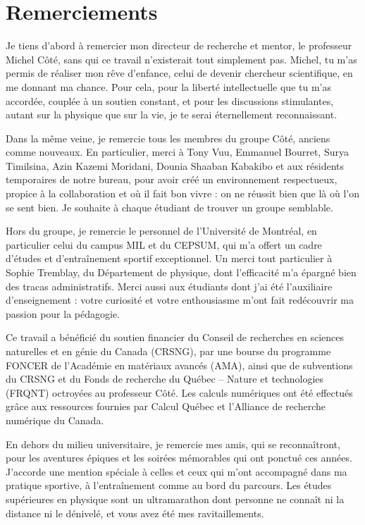 \chapter*{Remerciements}

Je tiens d'abord à remercier mon directeur de recherche et mentor, le professeur Michel Côté, sans qui ce travail n'existerait tout simplement pas. Michel, tu m'as permis de réaliser mon rêve d'enfance, celui de devenir chercheur scientifique, en me donnant ma chance. Pour cela, pour la liberté intellectuelle que tu m'as accordée, couplée à un soutien constant, et pour les discussions stimulantes, autant sur la physique que sur la vie, je te serai éternellement reconnaissant.

Dans la même veine, je remercie tous les membres du groupe Côté, anciens comme nouveaux. En particulier, merci à Tony Vuu, Emmanuel Bourret, Surya Timilsina, Azin Kazemi Moridani, Dounia Shaaban Kabakibo et aux résidents temporaires de notre bureau, pour avoir créé un environnement respectueux, propice à la collaboration et où il fait bon vivre : on ne réussit bien que là où l'on se sent bien. Je souhaite à chaque étudiant de trouver un groupe semblable.

Hors du groupe, je remercie le personnel de l'Université de Montréal, en particulier celui du campus MIL et du CEPSUM, qui m'a offert un cadre d'études et d'entraînement sportif exceptionnel. Un merci tout particulier à Sophie Tremblay, du Département de physique, dont l'efficacité m'a épargné bien des tracas administratifs. Merci aussi aux étudiants dont j'ai été l'auxiliaire d'enseignement : votre curiosité et votre enthousiasme m'ont fait redécouvrir ma passion pour la pédagogie.

Ce travail a bénéficié du soutien financier du Conseil de recherches en sciences naturelles et en génie du Canada (CRSNG), par une bourse du programme FONCER de l'Académie en matériaux avancés (AMA), ainsi que de subventions du CRSNG et du Fonds de recherche du Québec -- Nature et technologies (FRQNT) octroyées au professeur Côté. Les calculs numériques ont été effectués grâce aux ressources fournies par Calcul Québec et l'Alliance de recherche numérique du Canada.

En dehors du milieu universitaire, je remercie mes amis, qui se reconnaîtront, pour les aventures épiques et les soirées mémorables qui ont ponctué ces années. J'accorde une mention spéciale à celles et ceux qui m'ont accompagné dans ma pratique sportive, à l'entraînement comme au bord du parcours. Les études supérieures en physique sont un ultramarathon dont personne ne connaît ni la distance ni le dénivelé, et vous avez été mes ravitaillements.

